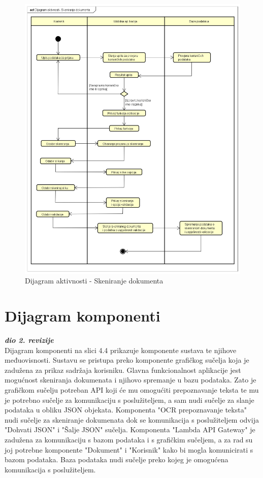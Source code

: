 	
	\begin{figure}
		\includegraphics[width=\linewidth]{./dijagrami/dijagram_aktivnosti.png}
		\caption{Dijagram aktivnosti - Skeniranje dokumenta}
		\label{fig:Aktivnost}
	\end{figure}
	
	\eject
		\section{Dijagram komponenti}
		
			\textbf{\textit{dio 2. revizije}}\\
		
			
			 
			 Dijagram komponenti na slici 4.4 prikazuje komponente sustava te njihove međuovisnosti. Sustavu se pristupa preko komponente grafičkog sučelja koja je zadužena za prikaz sadržaja korisniku. Glavna funkcionalnost aplikacije jest mogućnost skeniranja dokumenata i njihovo spremanje u bazu podataka. Zato je grafičkom sučelju potreban API koji će mu omogućiti prepoznavanje teksta te mu je potrebno sučelje za komunikaciju s poslužiteljem, a sam nudi sučelje za slanje podataka u obliku JSON objekata. Komponenta "OCR prepoznavanje teksta" nudi sučelje za skeniranje dokumenata dok se komunikacija s poslužiteljem odvija "Dohvati JSON" i "Šalje JSON" sučelja. Komponenta "Lambda API Gateway" je zadužena za komunikaciju s bazom podataka i s grafičkim sučeljem, a za rad su joj potrebne komponente "Dokument" i "Korisnik" kako bi mogla komunicirati s bazom podataka. Baza podataka nudi sučelje preko kojeg je omogućena komunikacija s poslužiteljem.
			 
